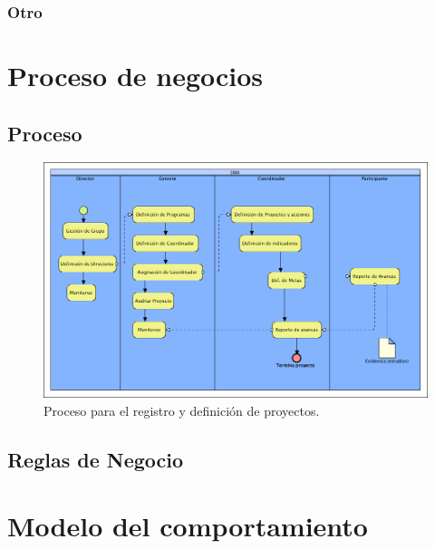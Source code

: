 \documentclass[10pt]{book}
\begin{document}
\subsection{Otro}
\begin{requerimientos}
\end{requerimientos}

\chapter{Proceso de negocios}


\section{Proceso}

\begin{figure}[htbp!]
	\begin{center}
		\includegraphics[width=.8\textwidth]{images/proceso}
		\caption{Proceso para el registro y definición de proyectos.}
		\label{fig:default}
	\end{center}
\end{figure}

\section{Reglas de Negocio}



\chapter{Modelo del comportamiento}
\end{document}
